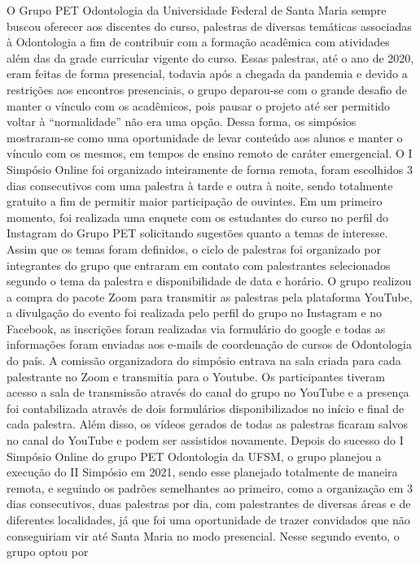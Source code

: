 O Grupo PET Odontologia da Universidade Federal de Santa Maria sempre buscou oferecer aos
discentes do curso, palestras de diversas temáticas associadas à Odontologia a fim de contribuir
com a formação acadêmica com atividades além das da grade curricular vigente do curso. Essas
palestras, até o ano de 2020, eram feitas de forma presencial, todavia após a chegada da
pandemia e devido a restrições aos encontros presenciais, o grupo deparou-se com o grande
desafio de manter o vínculo com os acadêmicos, pois pausar o projeto até ser permitido voltar à
“normalidade” não era uma opção. Dessa forma, os simpósios mostraram-se como uma
oportunidade de levar conteúdo aos alunos e manter o vínculo com os mesmos, em tempos de
ensino remoto de caráter emergencial. O I Simpósio Online foi organizado inteiramente de forma
remota, foram escolhidos 3 dias consecutivos com uma palestra à tarde e outra à noite, sendo
totalmente gratuito a fim de permitir maior participação de ouvintes. Em um primeiro momento,
foi realizada uma enquete com os estudantes do curso no perfil do Instagram do Grupo PET
solicitando sugestões quanto a temas de interesse. Assim que os temas foram definidos, o ciclo
de palestras foi organizado por integrantes do grupo que entraram em contato com palestrantes
selecionados segundo o tema da palestra e disponibilidade de data e horário. O grupo realizou a
compra do pacote Zoom para transmitir as palestras pela plataforma YouTube, a divulgação do
evento foi realizada pelo perfil do grupo no Instagram e no Facebook, as inscrições foram
realizadas via formulário do google e todas as informações foram enviadas aos e-mails de
coordenação de cursos de Odontologia do país. A comissão organizadora do simpósio entrava na
sala criada para cada palestrante no Zoom e transmitia para o Youtube. Os participantes tiveram
acesso a sala de transmissão através do canal do grupo no YouTube e a presença foi
contabilizada através de dois formulários disponibilizados no início e final de cada palestra.
Além disso, os vídeos gerados de todas as palestras ficaram salvos no canal do YouTube e
podem ser assistidos novamente. Depois do sucesso do I Simpósio Online do grupo PET
Odontologia da UFSM, o grupo planejou a execução do II Simpósio em 2021, sendo esse
planejado totalmente de maneira remota, e seguindo os padrões semelhantes ao primeiro, como a
organização em 3 dias consecutivos, duas palestras por dia, com palestrantes de diversas áreas e
de diferentes localidades, já que foi uma oportunidade de trazer convidados que não
conseguiriam vir até Santa Maria no modo presencial. Nesse segundo evento, o grupo optou por
